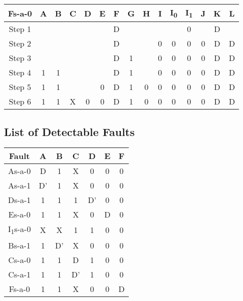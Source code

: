 \documentclass[11pt]{report}
\begin{document}
\begin{tabular}{ |c||c|c|c|c|c|c|c|c|c|c|c|c|c|c| }
\hline
\bf Fs-a-0 & \bf A & \bf B & \bf C & \bf D & \bf E & \bf F & G & H & I & I\textsubscript{0} & I\textsubscript{1} & J & K & \bf L \\
\hline
\hline
Step 1 & & & & & & D & & & & & 0 & & D & \\
\hline
Step 2 & & & & & & D & & & 0 & 0 & 0 & 0 & D & D \\
\hline
Step 3 & & & & & & D & 1 & & 0 & 0 & 0 & 0 & D & D \\
\hline
Step 4 & 1 & 1 & & & & D & 1 & & 0 & 0 & 0 & 0 & D & D \\
\hline
Step 5 & 1 & 1 & & & 0 & D & 1 & 0 & 0 & 0 & 0 & 0 & D & D \\
\hline
Step 6 & 1 & 1 & X & 0 & 0 & D & 1 & 0 & 0 & 0 & 0 & 0 & D & D \\
\hline
\end{tabular}

\subsection*{List of Detectable Faults}
\begin{tabular}{|c||c|c|c|c|c|c|}
    \hline
    Fault & A & B & C & D & E & F
    \\
    \hline
    \hline
    As-a-0 & D & 1 & X & 0 & 0 & 0 \\
    \hline
    As-a-1 & D' & 1 & X & 0 & 0 & 0 \\
    \hline
    Ds-a-1 & 1 & 1 & 1 & D' & 0 & 0 \\
    \hline
    Es-a-0 & 1 & 1 & X & 0 & D & 0 \\
    \hline
    I\textsubscript{1}s-a-0 & X & X & 1 & 1 & 0 & 0 \\
    \hline
    Bs-a-1 & 1 & D' & X & 0 & 0 & 0 \\
    \hline
    Cs-a-0 & 1 & 1 & D & 1 & 0 & 0 \\
    \hline
    Cs-a-1 & 1 & 1 & D' & 1 & 0 & 0 \\
    \hline
    Fs-a-0 & 1 & 1 & X & 0 & 0 & D \\
    \hline
\end{tabular}
\end{document}
